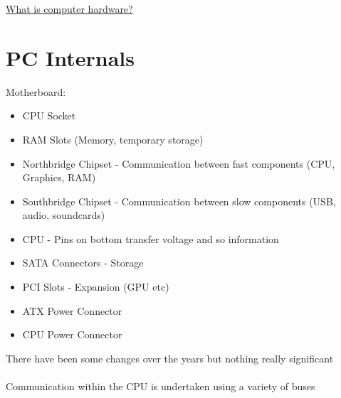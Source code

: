 \documentclass{article}[18pt]
\begin{document}
\begin{center}
\underline{\huge What is computer hardware?}
\end{center}
\section{PC Internals}
Motherboard:
\begin{itemize}
\item CPU Socket
\item RAM Slots (Memory, temporary storage)
\item Northbridge Chipset - Communication between fast components (CPU, Graphics, RAM)
\item Southbridge Chipset - Communication between slow components (USB, audio, soundcards)
\item CPU - Pins on bottom transfer voltage and so information
\item SATA Connectors  - Storage
\item PCI Slots - Expansion (GPU etc)
\item ATX Power Connector
\item CPU Power Connector
\end{itemize}
There have been some changes over the years but nothing really significant\\
\\
Communication within the CPU is undertaken using a variety of buses
\end{document}
